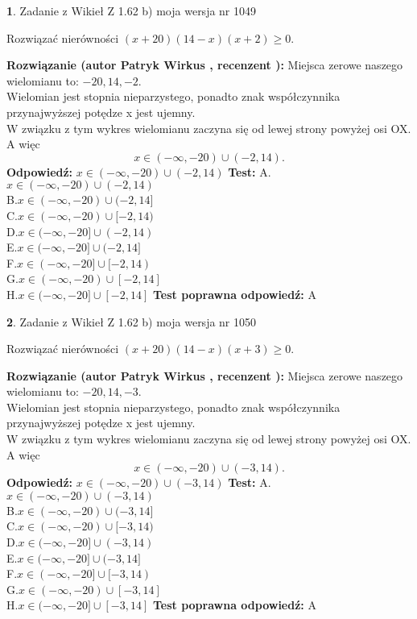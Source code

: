\documentclass[12pt, a4paper]{article}
\theoremstyle{definition} %
\newtheorem{zad}{}
\newcommand{\zadStart}[1]{\begin{zad}#1\newline}
\newcommand{\zadStop}{\end{zad}}
\newcommand{\rozwStart}[2]{\noindent \textbf{Rozwiązanie (autor #1 , recenzent #2): }\newline}
\newcommand{\rozwStop}{\newline}
\newcommand{\odpStart}{\noindent \textbf{Odpowiedź:}\newline}
\newcommand{\odpStop}{\newline}
\newcommand{\testStart}{\noindent \textbf{Test:}\newline}
\newcommand{\testStop}{\newline}
\newcommand{\kluczStart}{\noindent \textbf{Test poprawna odpowiedź:}\newline}
\newcommand{\kluczStop}{\newline}
\begin{document}
\zadStart{Zadanie z Wikieł Z 1.62 b) moja wersja nr 1049}

Rozwiązać nierówności $(x+20)(14-x)(x+2)\ge0$.
\zadStop
\rozwStart{Patryk Wirkus}{}
Miejsca zerowe naszego wielomianu to: $-20, 14, -2$.\\
Wielomian jest stopnia nieparzystego, ponadto znak współczynnika przy\linebreak najwyższej potędze x jest ujemny.\\ W związku z tym wykres wielomianu zaczyna się od lewej strony powyżej osi OX. A więc $$x \in (-\infty,-20) \cup (-2,14).$$
\rozwStop
\odpStart
$x \in (-\infty,-20) \cup (-2,14)$
\odpStop
\testStart
A.$x \in (-\infty,-20) \cup (-2,14)$\\
B.$x \in (-\infty,-20) \cup (-2,14]$\\
C.$x \in (-\infty,-20) \cup [-2,14)$\\
D.$x \in (-\infty,-20] \cup (-2,14)$\\
E.$x \in (-\infty,-20] \cup (-2,14]$\\
F.$x \in (-\infty,-20] \cup [-2,14)$\\
G.$x \in (-\infty,-20) \cup [-2,14]$\\
H.$x \in (-\infty,-20] \cup [-2,14]$
\testStop
\kluczStart
A
\kluczStop



\zadStart{Zadanie z Wikieł Z 1.62 b) moja wersja nr 1050}

Rozwiązać nierówności $(x+20)(14-x)(x+3)\ge0$.
\zadStop
\rozwStart{Patryk Wirkus}{}
Miejsca zerowe naszego wielomianu to: $-20, 14, -3$.\\
Wielomian jest stopnia nieparzystego, ponadto znak współczynnika przy\linebreak najwyższej potędze x jest ujemny.\\ W związku z tym wykres wielomianu zaczyna się od lewej strony powyżej osi OX. A więc $$x \in (-\infty,-20) \cup (-3,14).$$
\rozwStop
\odpStart
$x \in (-\infty,-20) \cup (-3,14)$
\odpStop
\testStart
A.$x \in (-\infty,-20) \cup (-3,14)$\\
B.$x \in (-\infty,-20) \cup (-3,14]$\\
C.$x \in (-\infty,-20) \cup [-3,14)$\\
D.$x \in (-\infty,-20] \cup (-3,14)$\\
E.$x \in (-\infty,-20] \cup (-3,14]$\\
F.$x \in (-\infty,-20] \cup [-3,14)$\\
G.$x \in (-\infty,-20) \cup [-3,14]$\\
H.$x \in (-\infty,-20] \cup [-3,14]$
\testStop
\kluczStart
A
\kluczStop
\end{document}
